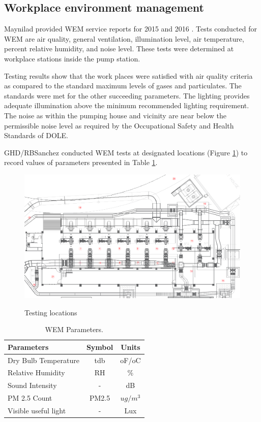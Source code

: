 \subsection{Workplace environment management}
\label{237}
Maynilad provided WEM service reports for 2015 \cite{Berkman2015} and 2016 \cite{Berkman2016}. Tests conducted for WEM are air quality, general ventilation, illumination level, air temperature, percent relative humidity, and noise level. These tests were determined at workplace stations inside the pump station. 

Testing results show that the work places were satisfied with air quality criteria as compared to the standard maximum levels of gases and particulates. The standards were met for the other succeeding parameters. The lighting provides adequate illumination above the minimum recommended lighting requirement. The noise as within the pumping house and vicinity are near below the permissible noise level as required by the Occupational Safety and Health Standards of DOLE. 

GHD/RBSanchez conducted WEM tests at designated locations (Figure \ref{ch02_wem01}) to record values of parameters presented in Table \ref{ch02_tbl_wemparameter}.

\begin{figure}[!htb]
	\includegraphics[scale=2]{figures/ch02_wem01} \\
	\caption{Testing locations}
	\label{ch02_wem01} 
\end{figure}

\begin{table}[h]
	\caption{WEM Parameters.}
	\label{ch02_tbl_wemparameter}
	{\footnotesize
\begin{tabular}{l|l|l}
	\hline
	Parameters & \multicolumn{1}{c|}{Symbol} & \multicolumn{1}{c}{Units} \\ 
	\hline
	Dry Bulb Temperature & \multicolumn{1}{c|}{tdb} & \multicolumn{1}{c}{oF/oC} \\ 
	Relative Humidity & \multicolumn{1}{c|}{RH} & \multicolumn{1}{c}{\%} \\ 
	Sound Intensity & \multicolumn{1}{c|}{-} & \multicolumn{1}{c}{dB} \\ 
	PM 2.5 Count & \multicolumn{1}{c|}{PM2.5} & \multicolumn{1}{c}{$ug/m^3$} \\ 
	Visible useful light & \multicolumn{1}{c|}{-} & \multicolumn{1}{c}{Lux} \\ 
	\hline
\end{tabular}	
	}
\end{table}

